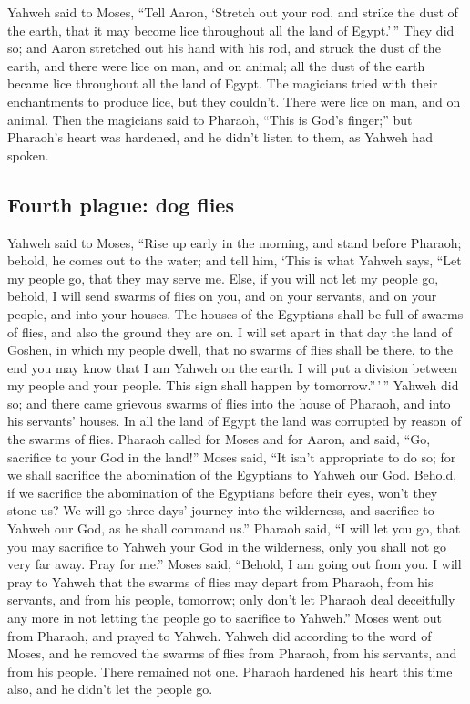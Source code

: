  Yahweh said to Moses, ``Tell Aaron, `Stretch out your
rod, and strike the dust of the earth, that it may become lice
throughout all the land of Egypt.'\,''  They did so; and
Aaron stretched out his hand with his rod, and struck the dust of the
earth, and there were lice on man, and on animal; all the dust of the
earth became lice throughout all the land of Egypt.  The
magicians tried with their enchantments to produce lice, but they
couldn't. There were lice on man, and on animal.  Then
the magicians said to Pharaoh, ``This is God's finger;'' but Pharaoh's
heart was hardened, and he didn't listen to them, as Yahweh had spoken.

\hypertarget{fourth-plague-dog-flies}{%
\subsection{Fourth plague: dog flies}\label{fourth-plague-dog-flies}}

 Yahweh said to Moses, ``Rise up early in the morning,
and stand before Pharaoh; behold, he comes out to the water; and tell
him, `This is what Yahweh says, ``Let my people go, that they may serve
me.  Else, if you will not let my people go, behold, I
will send swarms of flies on you, and on your servants, and on your
people, and into your houses. The houses of the Egyptians shall be full
of swarms of flies, and also the ground they are on.  I
will set apart in that day the land of Goshen, in which my people dwell,
that no swarms of flies shall be there, to the end you may know that I
am Yahweh on the earth.  I will put a division between my
people and your people. This sign shall happen by tomorrow.''\,'\,''
 Yahweh did so; and there came grievous swarms of flies
into the house of Pharaoh, and into his servants' houses. In all the
land of Egypt the land was corrupted by reason of the swarms of flies.
 Pharaoh called for Moses and for Aaron, and said, ``Go,
sacrifice to your God in the land!''  Moses said, ``It
isn't appropriate to do so; for we shall sacrifice the abomination of
the Egyptians to Yahweh our God. Behold, if we sacrifice the abomination
of the Egyptians before their eyes, won't they stone us? 
We will go three days' journey into the wilderness, and sacrifice to
Yahweh our God, as he shall command us.''  Pharaoh said,
``I will let you go, that you may sacrifice to Yahweh your God in the
wilderness, only you shall not go very far away. Pray for me.''
 Moses said, ``Behold, I am going out from you. I will
pray to Yahweh that the swarms of flies may depart from Pharaoh, from
his servants, and from his people, tomorrow; only don't let Pharaoh deal
deceitfully any more in not letting the people go to sacrifice to
Yahweh.''  Moses went out from Pharaoh, and prayed to
Yahweh.  Yahweh did according to the word of Moses, and
he removed the swarms of flies from Pharaoh, from his servants, and from
his people. There remained not one.  Pharaoh hardened his
heart this time also, and he didn't let the people go.

